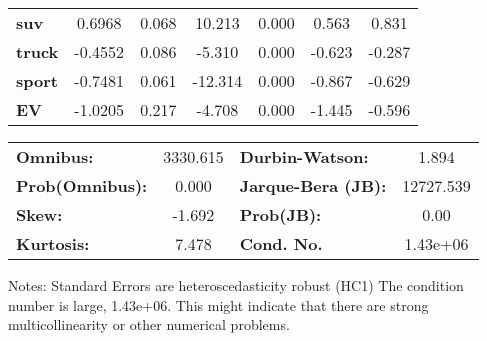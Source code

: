 \begin{center}
\begin{tabular}{lcccccc}
\textbf{suv}                      &       0.6968  &        0.068     &    10.213  &         0.000        &        0.563    &        0.831     \\
\textbf{truck}                    &      -0.4552  &        0.086     &    -5.310  &         0.000        &       -0.623    &       -0.287     \\
\textbf{sport}                    &      -0.7481  &        0.061     &   -12.314  &         0.000        &       -0.867    &       -0.629     \\
\textbf{EV}                       &      -1.0205  &        0.217     &    -4.708  &         0.000        &       -1.445    &       -0.596     \\
\bottomrule
\end{tabular}
\begin{tabular}{lclc}
\textbf{Omnibus:}       & 3330.615 & \textbf{  Durbin-Watson:     } &     1.894  \\
\textbf{Prob(Omnibus):} &   0.000  & \textbf{  Jarque-Bera (JB):  } & 12727.539  \\
\textbf{Skew:}          &  -1.692  & \textbf{  Prob(JB):          } &      0.00  \\
\textbf{Kurtosis:}      &   7.478  & \textbf{  Cond. No.          } &  1.43e+06  \\
\bottomrule
\end{tabular}
\end{center}

Notes: \newline
 [1] Standard Errors are heteroscedasticity robust (HC1) \newline
 [2] The condition number is large, 1.43e+06. This might indicate that there are \newline
 strong multicollinearity or other numerical problems.